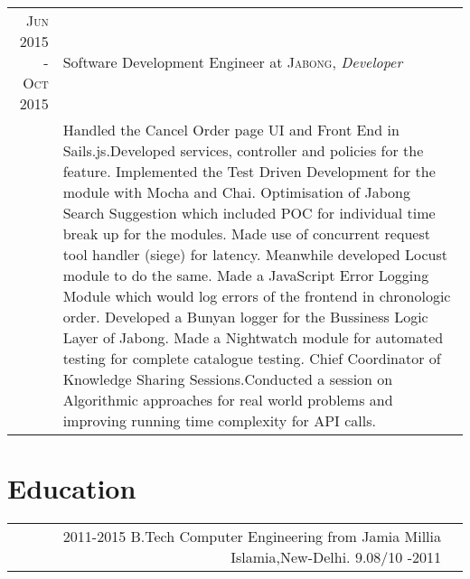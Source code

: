 \documentclass[a4paper,10pt]{article}
\begin{document}
\begin{tabular}{r|p{11cm}}
\textsc{Jun 2015 - Oct 2015} & Software Development Engineer at \textsc{Jabong}, \newline \emph{Developer}\\&\footnotesize{Handled the Cancel Order page UI and Front End in Sails.js.Developed services, controller and policies for the feature.\newline
Implemented the Test Driven Development for the module with Mocha and Chai.\newline
Optimisation of Jabong Search Suggestion which included POC for individual time break up for the modules. Made use of
concurrent request tool handler (siege) for latency. Meanwhile developed Locust module to do the same.\newline
Made a JavaScript Error Logging Module which would log errors of the frontend in chronologic order.\newline
Developed a Bunyan logger for the Bussiness Logic Layer of Jabong.\newline
Made a Nightwatch module for automated testing for complete catalogue testing.\newline
Chief Coordinator of Knowledge Sharing Sessions.Conducted a  session on Algorithmic approaches for real world problems and improving running time complexity for API calls.}
\end{tabular}
\section{Education}
\begin{tabular}{rl}
 \textsc{2011-2015} \footnotesize{  B.Tech Computer Engineering from Jamia Millia Islamia,New-Delhi. 9.08/10 \newline 
   2010-2011 }
 \end{tabular}
\end{document}
